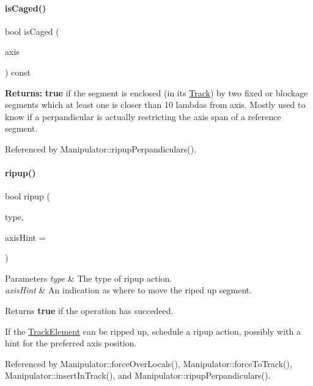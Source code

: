 \paragraph{\texorpdfstring{is\+Caged()}{isCaged()}}
{\footnotesize\ttfamily bool is\+Caged (\begin{DoxyParamCaption}\item[{\textbf{ Db\+U\+::\+Unit}}]{axis }\end{DoxyParamCaption}) const}

{\bfseries Returns\+:} {\bfseries true} if the segment is enclosed (in it\textquotesingle{}s \hyperlink{classKite_1_1Track}{Track}) by two fixed or blockage segments which at least one is closer than 10 lambdas from {\ttfamily axis}. Mostly used to know if a perpandicular is actually restricting the axis span of a reference segment. 

Referenced by Manipulator\+::ripup\+Perpandiculars().

\mbox{\label{classKite_1_1Manipulator_a370b5a5373d3019510d4ec22f44c76c2}} 
\paragraph{\texorpdfstring{ripup()}{ripup()}}
{\footnotesize\ttfamily bool ripup (\begin{DoxyParamCaption}\item[{unsigned int}]{type,  }\item[{\textbf{ Db\+U\+::\+Unit}}]{axis\+Hint = {} }\end{DoxyParamCaption})}


\begin{DoxyParams}{Parameters}
{\em type} & The type of ripup action. \\
\hline
{\em axis\+Hint} & An indication as where to move the riped up segment. \\
\hline
\end{DoxyParams}
\begin{DoxyReturn}{Returns}
{\bfseries true} if the operation has succedeed.
\end{DoxyReturn}
If the \hyperlink{classKite_1_1TrackElement}{Track\+Element} can be ripped up, schedule a ripup action, possibly with a hint for the preferred axis position. 

Referenced by Manipulator\+::force\+Over\+Locals(), Manipulator\+::force\+To\+Track(), Manipulator\+::insert\+In\+Track(), and Manipulator\+::ripup\+Perpandiculars().

